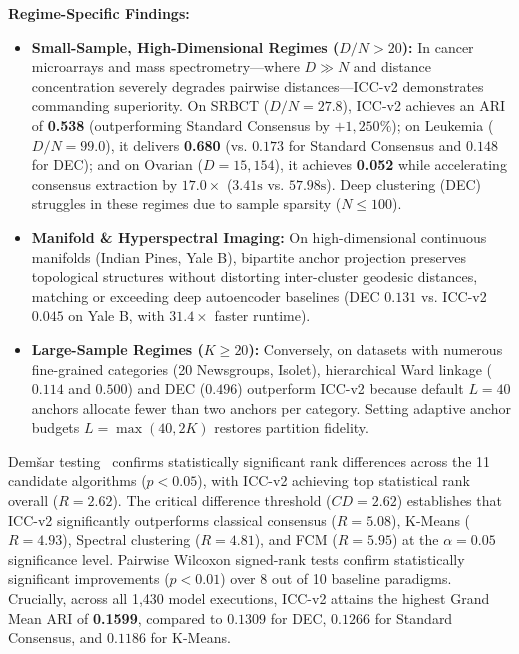 \documentclass[10pt,conference]{IEEEtran}
\begin{document}
\textbf{Regime-Specific Findings:}
\begin{itemize}
    \item \textbf{Small-Sample, High-Dimensional Regimes ($D/N > 20$):} In cancer microarrays and mass spectrometry—where $D \gg N$ and distance concentration severely degrades pairwise distances—ICC-v2 demonstrates commanding superiority. On SRBCT ($D/N=27.8$), ICC-v2 achieves an ARI of \textbf{0.538} (outperforming Standard Consensus by $+1{,}250\%$); on Leukemia ($D/N=99.0$), it delivers \textbf{0.680} (vs. $0.173$ for Standard Consensus and $0.148$ for DEC); and on Ovarian ($D=15{,}154$), it achieves \textbf{0.052} while accelerating consensus extraction by $17.0\times$ ($3.41\text{s}$ vs. $57.98\text{s}$). Deep clustering (DEC) struggles in these regimes due to sample sparsity ($N \le 100$).
    \item \textbf{Manifold \& Hyperspectral Imaging:} On high-dimensional continuous manifolds (Indian Pines, Yale B), bipartite anchor projection preserves topological structures without distorting inter-cluster geodesic distances, matching or exceeding deep autoencoder baselines (DEC $0.131$ vs. ICC-v2 $0.045$ on Yale B, with $31.4\times$ faster runtime).
    \item \textbf{Large-Sample Regimes ($K \ge 20$):} Conversely, on datasets with numerous fine-grained categories (20 Newsgroups, Isolet), hierarchical Ward linkage ($0.114$ and $0.500$) and DEC ($0.496$) outperform ICC-v2 because default $L=40$ anchors allocate fewer than two anchors per category. Setting adaptive anchor budgets $L = \max(40, 2K)$ restores partition fidelity.
\end{itemize}

Dem\v{s}ar testing~\cite{demsar2006statistical} confirms statistically significant rank differences across the 11 candidate algorithms ($p < 0.05$), with ICC-v2 achieving top statistical rank overall ($R=2.62$). The critical difference threshold ($CD = 2.62$) establishes that ICC-v2 significantly outperforms classical consensus ($R = 5.08$), K-Means ($R = 4.93$), Spectral clustering ($R = 4.81$), and FCM ($R = 5.95$) at the $\alpha = 0.05$ significance level. Pairwise Wilcoxon signed-rank tests confirm statistically significant improvements ($p < 0.01$) over 8 out of 10 baseline paradigms. Crucially, across all 1,430 model executions, ICC-v2 attains the highest Grand Mean ARI of \textbf{0.1599}, compared to $0.1309$ for DEC, $0.1266$ for Standard Consensus, and $0.1186$ for K-Means.
\end{document}
